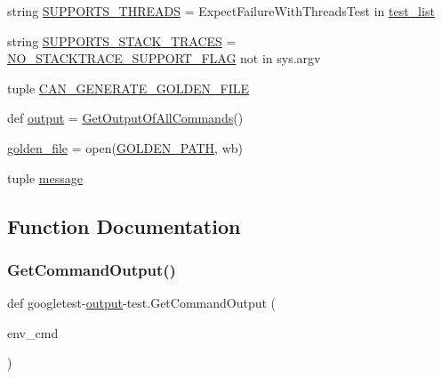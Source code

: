 \begin{DoxyCompactItemize}
\item 
string \mbox{\hyperlink{namespacegoogletest-output-test_a9dd8b32109121ee9ce8a8c42130ca621}{S\+U\+P\+P\+O\+R\+T\+S\+\_\+\+T\+H\+R\+E\+A\+DS}} = \textquotesingle{}Expect\+Failure\+With\+Threads\+Test\textquotesingle{} in \mbox{\hyperlink{namespacegoogletest-output-test_aa116be76cb5d1da2469f2811706bf08e}{test\+\_\+list}}
\item 
string \mbox{\hyperlink{namespacegoogletest-output-test_a82e006ce33949232748aa4fcd1d228c5}{S\+U\+P\+P\+O\+R\+T\+S\+\_\+\+S\+T\+A\+C\+K\+\_\+\+T\+R\+A\+C\+ES}} = \mbox{\hyperlink{namespacegoogletest-output-test_aa5200b284ce09415c0061e96811cf24c}{N\+O\+\_\+\+S\+T\+A\+C\+K\+T\+R\+A\+C\+E\+\_\+\+S\+U\+P\+P\+O\+R\+T\+\_\+\+F\+L\+AG}} not in sys.\+argv
\item 
tuple \mbox{\hyperlink{namespacegoogletest-output-test_a7f642ce6ab89839d2ea88a438ef6b1f3}{C\+A\+N\+\_\+\+G\+E\+N\+E\+R\+A\+T\+E\+\_\+\+G\+O\+L\+D\+E\+N\+\_\+\+F\+I\+LE}}
\item 
def \mbox{\hyperlink{namespacegoogletest-output-test_ab3df9ce09186215a36c30454cf282417}{output}} = \mbox{\hyperlink{namespacegoogletest-output-test_a3f97b075a05d215e5f7d1c2b71973f78}{Get\+Output\+Of\+All\+Commands}}()
\item 
\mbox{\hyperlink{namespacegoogletest-output-test_a1f278fb4e124e36b91d94699d921b1c4}{golden\+\_\+file}} = open(\mbox{\hyperlink{namespacegoogletest-output-test_aaf2c3cbfc15d83d986e1e2ba99a94a3e}{G\+O\+L\+D\+E\+N\+\_\+\+P\+A\+TH}}, \textquotesingle{}wb\textquotesingle{})
\item 
tuple \mbox{\hyperlink{namespacegoogletest-output-test_ac8183a857acd7838ccb984117377852e}{message}}
\end{DoxyCompactItemize}


\subsection{Function Documentation}
\mbox{\label{namespacegoogletest-output-test_ab1776de1dd70435fb1af39390bd7d4f3}} 
\subsubsection{\texorpdfstring{GetCommandOutput()}{GetCommandOutput()}}
{\footnotesize\ttfamily def googletest-\/\mbox{\hyperlink{namespacegoogletest-output-test_ab3df9ce09186215a36c30454cf282417}{output}}-\/test.\+Get\+Command\+Output (\begin{DoxyParamCaption}\item[{}]{env\+\_\+cmd }\end{DoxyParamCaption})}

